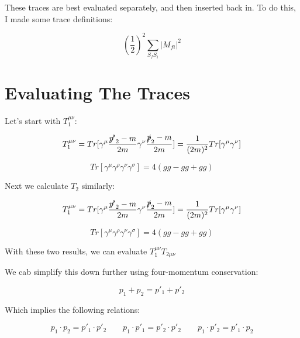 \documentclass[a4]{article}
\begin{document}
    These traces are best evaluated separately, and then inserted back in. To do this, I made some trace definitions:

    \begin{equation}
        (\frac{1}{2})^2 \sum_{S_f S_i} |M_{f i}|^2
    \end{equation}

    \section*{Evaluating The Traces}

    Let's start with $T_1^{\mu \nu}$:

    \begin{equation}
        T_1^{\mu \nu} = Tr [\gamma^\mu \frac{\slashed{p'}_2 - m}{2m} \gamma^\nu \frac{\slashed{p}_2 - m}{2 m}] = \frac{1}{(2m)^2} Tr[\gamma^\mu \gamma^\nu]
    \end{equation}

    \begin{equation}
        Tr [\gamma^\mu \gamma^\rho \gamma^\nu \gamma^\sigma] = 4(g g - g g + g g)
    \end{equation}

    Next we calculate $T_2$ similarly:

    \begin{equation}
        T_1^{\mu \nu} = Tr [\gamma^\mu \frac{\slashed{p'}_2 - m}{2m} \gamma^\nu \frac{\slashed{p}_2 - m}{2 m}] = \frac{1}{(2m)^2} Tr[\gamma^\mu \gamma^\nu]
    \end{equation}

    \begin{equation}
        Tr [\gamma^\mu \gamma^\rho \gamma^\nu \gamma^\sigma] = 4(g g - g g + g g)
    \end{equation}

    With these two results, we can evaluate $T_1^{\mu \nu} T_{2 \mu \nu}$

    We cab simplify this down further using four-momentum conservation:

    \begin{equation}
        p_1 + p_2 = p'_1 + p'_2
    \end{equation}

    Which implies the following relations:

    \begin{equation}
        p_1 \cdot p_2 = p'_1 \cdot p'_2 \qquad p_1 \cdot p'_1 = p'_2 \cdot p'_2 \qquad p_1 \cdot p'_2 = p'_1 \cdot p_2
    \end{equation}
\end{document}
